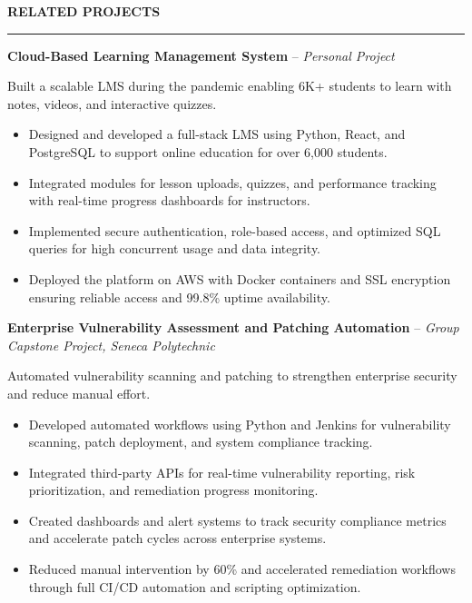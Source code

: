 \documentclass[10pt,letterpaper]{article}
\begin{document}
\vspace{6pt}

\textbf{RELATED PROJECTS}\\[-8pt]
\noindent\rule{\textwidth}{1pt}

\vspace{-2pt}

\textbf{Cloud-Based Learning Management System} -- \emph{Personal Project}

\vspace{-1pt}

Built a scalable LMS during the pandemic enabling 6K+ students to learn with notes, videos, and interactive quizzes.
\vspace{-1pt}
\begin{itemize}
\item Designed and developed a full-stack LMS using Python, React, and PostgreSQL to support online education for over 6,000 students.
\item Integrated modules for lesson uploads, quizzes, and performance tracking with real-time progress dashboards for instructors.
\item Implemented secure authentication, role-based access, and optimized SQL queries for high concurrent usage and data integrity.
\item Deployed the platform on AWS with Docker containers and SSL encryption ensuring reliable access and 99.8\% uptime availability.
\end{itemize}

\textbf{Enterprise Vulnerability Assessment and Patching Automation} -- \emph{Group Capstone Project, Seneca Polytechnic}

\vspace{-1pt}

Automated vulnerability scanning and patching to strengthen enterprise security and reduce manual effort.
\vspace{-1pt}
\begin{itemize}
\item Developed automated workflows using Python and Jenkins for vulnerability scanning, patch deployment, and system compliance tracking.
\item Integrated third-party APIs for real-time vulnerability reporting, risk prioritization, and remediation progress monitoring.
\item Created dashboards and alert systems to track security compliance metrics and accelerate patch cycles across enterprise systems.
\item Reduced manual intervention by 60\% and accelerated remediation workflows through full CI/CD automation and scripting optimization.
\end{itemize}
\end{document}
